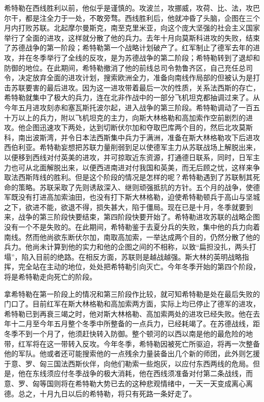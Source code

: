 希特勒在西线胜利以前，他似乎是谨慎的。攻波兰，攻挪威，攻荷、比、法，攻巴尔干，都是注全力于一处，不敢旁骛。西线胜利后，他就冲昏了头脑，企图在三个月内打败苏联。北起摩尔曼斯克，南至克里米亚，向这个庞大坚强的社会主义国家举行了全面的进攻，这样就分散了他的兵力。去年十月向莫斯科进攻的失败，结束了苏德战争的第一阶段；希特勒第一个战略计划破产了。红军制止了德军去年的进攻，并在冬季举行了全线的反攻，是为苏德战争的第二阶段；希特勒转到了退却和防御的地位。在此期间，希特勒撤消了他的前线总司令勃鲁齐区，自己充任总司令，决定放弃全面的进攻计划，搜索欧洲全力，准备向南线作局部的但被认为是打击苏联要害的最后进攻。因为这一进攻带着最后一次的性质，关系法西斯的存亡，希特勒就集中了极大的兵力，连在北非作战中的一部分飞机坦克都抽调过来了。从今年五月进攻刻赤和塞瓦斯托波尔起，进入战争的第三阶段。希特勒调动了一百五十万以上的兵力，附以飞机坦克的主力，向斯大林格勒和高加索作空前剧烈的进攻。他企图迅速攻下两处，达到切断伏尔加和夺取巴库两个目的，然后北攻莫斯科，南出波斯湾，并令日本法西斯集中兵力于满洲，准备在斯大林格勒攻下后进攻西伯利亚。希特勒妄想把苏联力量削弱到足以使德军主力从苏联战场上解脱出来，以便移到西线对付英美的进攻，并可掠取近东资源，打通德日联系，同时，日军主力也可从北面解脱出来，以便西进南进对付我国和英美，而无后顾之忧，这样来争取法西斯阵线的胜利。但是这个阶段的情况是怎样的呢？希特勒遇到了苏联制其死命的策略。苏联采取了先则诱敌深入、继则顽强抵抗的方针。五个月的战争，使德军既没有打进高加索油田，也没有打下斯大林格勒，迫使希特勒顿兵于高山与坚城之下，欲进不能，欲退不得，损失甚大，陷于僵局。现在已是十月，冬季就要到来，战争的第三阶段快要结束，第四阶段快要开始了。希特勒进攻苏联的战略企图没有一个不是失败的。在此期间，希特勒鉴于去夏分兵的失败，集中他的兵力向着南线。然而他尚欲东断伏尔加，南取高加索，一举达成两个目的，仍然分散了他的兵力。他尚未计算到他的实力和他的企图之间的不相称，以致“扁担没扎，两头打塌”，陷入目前的绝路。在相反方面，苏联则是越战越强。斯大林的英明战略指挥，完全站在主动的地位，处处把希特勒引向灭亡。今年冬季开始的第四个阶段，将是希特勒走向死亡的阶段。

拿希特勒在第一阶段上的情况和第三阶段作比较，就可知希特勒是处在最后失败的门口了。目前红军在斯大林格勒和高加索两方面，实际上均已停止了德军的进攻，希特勒已到再衰三竭之时，他对斯大林格勒、高加索两处的进攻已经失败。他在去年十二月至今年五月整个冬季中所整备的一点兵力，已经耗竭了。在苏德战线，距冬季不到一个月了，他须赶快转入防御。整个顿河的以西以南是他的最危险的地带，红军将在这一带转入反攻。今年冬季，希特勒因被死亡所驱迫，将再一次整备他的军队。他或者还可能搜索他的一点残余力量装备出几个新的师团，此外则乞援于意、罗、匈三国法西斯伙伴，向他们勒索一些炮灰，以应付东西两线的危局。但是，他在东线须应付冬季战争的极大消耗，他在西线须准备对付第二条战线，而意、罗、匈等国则将在希特勒大势已去的这种悲观情绪中，一天一天变成离心离德。总之，十月九日以后的希特勒，将只有死路一条好走了。

